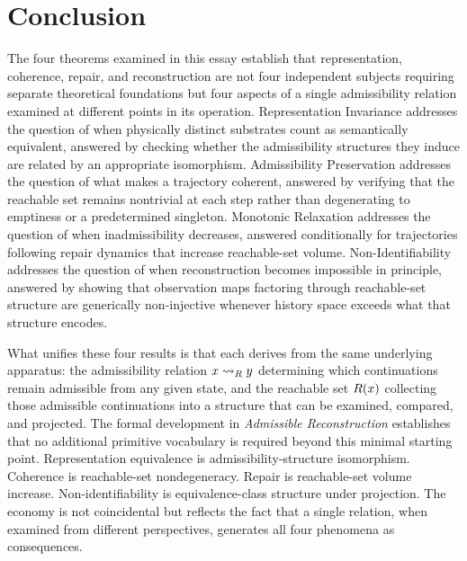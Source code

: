 \chapter{Conclusion}
\label{ch:essay-conclusion}

The four theorems examined in this essay establish that representation, coherence, repair, and reconstruction are not four independent subjects requiring separate theoretical foundations but four aspects of a single admissibility relation examined at different points in its operation. Representation Invariance addresses the question of when physically distinct substrates count as semantically equivalent, answered by checking whether the admissibility structures they induce are related by an appropriate isomorphism. Admissibility Preservation addresses the question of what makes a trajectory coherent, answered by verifying that the reachable set remains nontrivial at each step rather than degenerating to emptiness or a predetermined singleton. Monotonic Relaxation addresses the question of when inadmissibility decreases, answered conditionally for trajectories following repair dynamics that increase reachable-set volume. Non-Identifiability addresses the question of when reconstruction becomes impossible in principle, answered by showing that observation maps factoring through reachable-set structure are generically non-injective whenever history space exceeds what that structure encodes.

What unifies these four results is that each derives from the same underlying apparatus: the admissibility relation $x \rightsquigarrow_{R} y$ determining which continuations remain admissible from any given state, and the reachable set $R(x)$ collecting those admissible continuations into a structure that can be examined, compared, and projected. The formal development in \emph{Admissible Reconstruction} establishes that no additional primitive vocabulary is required beyond this minimal starting point. Representation equivalence is admissibility-structure isomorphism. Coherence is reachable-set nondegeneracy. Repair is reachable-set volume increase. Non-identifiability is equivalence-class structure under projection. The economy is not coincidental but reflects the fact that a single relation, when examined from different perspectives, generates all four phenomena as consequences.

